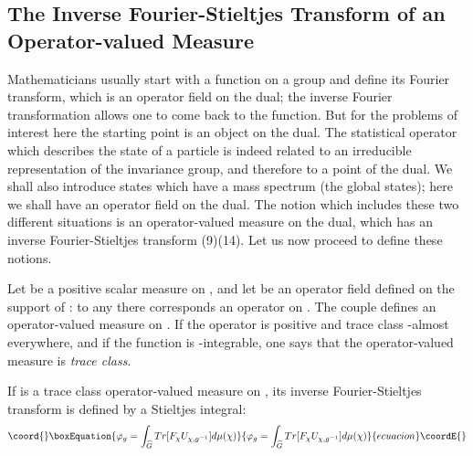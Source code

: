 \documentclass[a4paper,11pt]{article}
\def\Ucgm{U_{\chi,g^{-1}}}
\begin{document}
\subsection{The Inverse Fourier-Stieltjes Transform of an Operator-valued Measure}

Mathematicians usually start with a function on a group and define its Fourier transform, which 
is an operator field on the dual; the inverse Fourier transformation allows one to come back to 
the function. But for the problems of interest here the starting point is an object on the 
dual. The statistical operator which describes the state of a particle is indeed related to an 
irreducible representation of the invariance group, and therefore to a point of the dual. We 
shall also introduce states which have a mass spectrum (the global states); here we shall have 
an operator field on the dual. The notion which includes these two different situations is an 
operator-valued measure on the dual, which has an inverse Fourier-Stieltjes transform (9)(14). 
Let us now proceed to define these notions. 

Let \myHighlight{$\mu$}\coordHE{} be a positive scalar measure on \coordHE{}, and let \coordHE{} be an operator field 
defined on 
the support of \myHighlight{$\mu$}\coordHE{}: to any \coordHE{} there corresponds an operator \coordHE{} on 
\coordHE{}.  The couple \coordHE{}
defines an operator-valued measure on \coordHE{}. If the operator \coordHE{} is positive and 
trace class \myHighlight{$\mu$}\coordHE{}-almost everywhere, and if the function 
\coordHE{} is \myHighlight{$\mu$}\coordHE{}-integrable, one says that the operator-valued measure 
\coordHE{} is {\it trace class}. 

If \coordHE{} is a trace class operator-valued measure on \coordHE{} , its inverse 
Fourier-Stieltjes transform \myHighlight{$\varphi$}\coordHE{} is defined by a Stieltjes integral:
\begin{equation}\coord{}\boxEquation{
 \label{eq.3.3}
 \varphi_g = \int_{\Gc} Tr[F_{\chi} \Ucgm] d\mu(\chi)
}{
 \varphi_g = \int_{\Gc} Tr[F_{\chi} \Ucgm] d\mu(\chi)
}{ecuacion}\coordE{}\end{equation}
\end{document}

